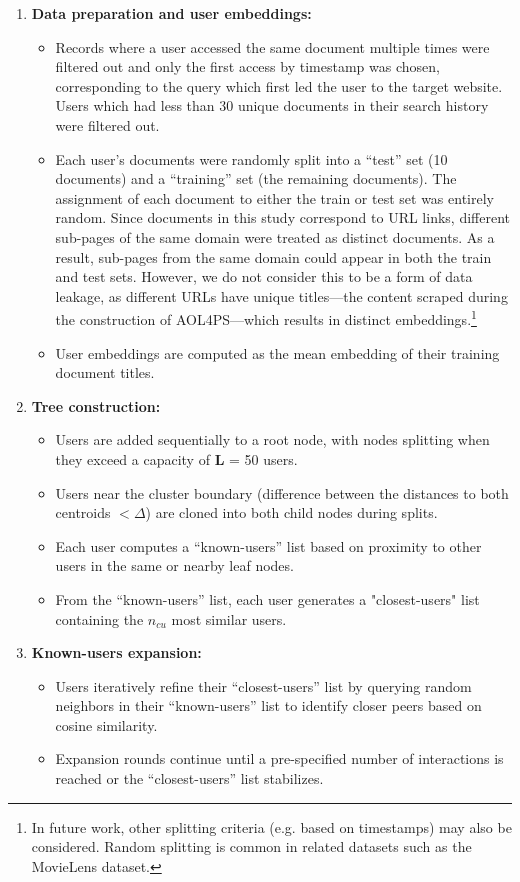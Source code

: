 \documentclass[10pt,journal]{IEEEtran}
\begin{document}
\begin{enumerate}
    \item \textbf{Data preparation and user embeddings:}
    \begin{itemize}
        \item Records where a user accessed the same document multiple times were filtered out and only the first access by timestamp was chosen, corresponding to the query which first led the user to the target website. Users which had less than 30 unique documents in their search history were filtered out.
        \item Each user’s documents were randomly split into a ``test'' set (10 documents) and a ``training'' set (the remaining documents). The assignment of each document to either the train or test set was entirely random. Since documents in this study correspond to URL links, different sub-pages of the same domain were treated as distinct documents. As a result, sub-pages from the same domain could appear in both the train and test sets. However, we do not consider this to be a form of data leakage, as different URLs have unique titles---the content scraped during the construction of AOL4PS---which results in distinct embeddings.\footnote{In future work, other splitting criteria (e.g. based on timestamps) may also be considered. Random splitting is common in related datasets such as the MovieLens dataset.}
        \item User embeddings are computed as the mean embedding of their training document titles.
    \end{itemize}
    \item \textbf{Tree construction:}
    \begin{itemize}
        \item Users are added sequentially to a root node, with nodes splitting when they exceed a capacity of \textbf{L} = 50 users.
        \item Users near the cluster boundary (difference between the distances to both centroids $< \Delta$) are cloned into both child nodes during splits.
        \item Each user computes a ``known-users'' list based on proximity to other users in the same or nearby leaf nodes.
        \item From the ``known-users'' list, each user generates a "closest-users" list containing the $n_{cu}$ most similar users.
    \end{itemize}
    \item \textbf{Known-users expansion:}
    \begin{itemize}
        \item Users iteratively refine their ``closest-users'' list by querying random neighbors in their ``known-users'' list to identify closer peers based on cosine similarity.
        \item Expansion rounds continue until a pre-specified number of interactions is reached or the ``closest-users'' list stabilizes.
    \end{itemize}
\end{enumerate}
\end{document}
